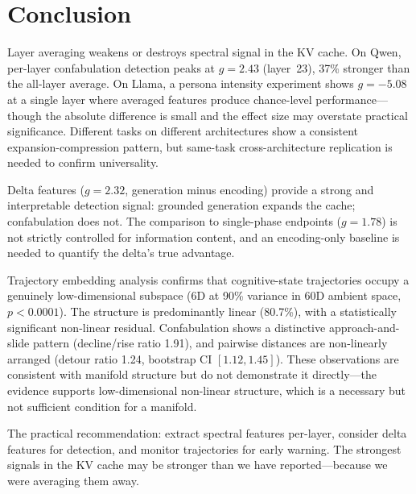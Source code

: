\documentclass[11pt,a4paper]{article}
\begin{document}
\section{Conclusion}
\label{sec:conclusion}

Layer averaging weakens or destroys spectral signal in the KV cache.
On Qwen, per-layer confabulation detection peaks at $g = 2.43$
(layer~23), 37\% stronger than the all-layer average. On Llama, a
persona intensity experiment shows $g = -5.08$ at a single layer
where averaged features produce chance-level performance---though the
absolute difference is small and the effect size may overstate
practical significance. Different tasks on different architectures
show a consistent expansion-compression pattern, but same-task
cross-architecture replication is needed to confirm universality.

Delta features ($g = 2.32$, generation minus encoding) provide a
strong and interpretable detection signal: grounded generation expands
the cache; confabulation does not. The comparison to single-phase
endpoints ($g = 1.78$) is not strictly controlled for information
content, and an encoding-only baseline is needed to quantify the
delta's true advantage.

Trajectory embedding analysis confirms that cognitive-state
trajectories occupy a genuinely low-dimensional subspace (6D at 90\%
variance in 60D ambient space, $p < 0.0001$). The structure is
predominantly linear (80.7\%), with a statistically significant
non-linear residual. Confabulation shows a distinctive
approach-and-slide pattern (decline/rise ratio 1.91), and pairwise
distances are non-linearly arranged (detour ratio 1.24, bootstrap CI
$[1.12, 1.45]$). These observations are consistent with manifold
structure but do not demonstrate it directly---the evidence supports
low-dimensional non-linear structure, which is a necessary but not
sufficient condition for a manifold.

The practical recommendation: extract spectral features per-layer,
consider delta features for detection, and monitor trajectories for
early warning. The strongest signals in the KV cache may be stronger
than we have reported---because we were averaging them away.

\end{document}

